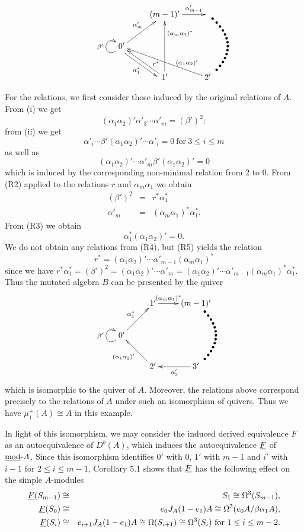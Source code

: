 \documentclass{amsart}
\begin{document}
$$\xymatrix{ & (m-1)' \ar@{<-}[dl]_{\alpha'_m} &   \ar@{<-}[l]_-{\alpha'_{m-1}} \\ 0' \ar@(dl, ul)^{\beta'}  \ar@{<-}[drr]^(.7){(\alpha_1\alpha_2)'} \ar[dr]<-1ex>_{\alpha_1^*}\\ & 1' \ar[ul]_(.3){r^*}  \ar[uu]_(.7){(\alpha_m\alpha_1)^*} & 2' \ar @{{}{*}} @/_2pc/[uu]}$$

For the relations, we first consider those induced by the original relations of $A$.  From (i) we get $$(\alpha_1\alpha_2)' \alpha'_3 \cdots \alpha'_m= (\beta')^2;$$ from (ii) we get $$\alpha'_i \cdots \beta' (\alpha_1 \alpha_2)' \cdots \alpha'_i = 0 \ \mbox{for}\ 3 \leq i \leq m$$ as well as $$(\alpha_1\alpha_2)' \cdots \alpha'_m \beta' (\alpha_1 \alpha_2)' = 0 $$ which is induced by the corresponding non-minimal relation from $2$ to $0$.  
From (R2) applied to the relations $r$ and $\alpha_m \alpha_1$ we obtain 
\begin{eqnarray*} (\beta')^2 & =  & r^*\alpha_1^* \\
 \alpha'_m & = & (\alpha_m \alpha_1)^*\alpha_1^*.
\end{eqnarray*}
From (R3) we obtain $$\alpha_1^*(\alpha_1 \alpha_2)' = 0.$$
We do not obtain any relations from (R4), but (R5) yields the relation
$$r^* =  (\alpha_1 \alpha_2)' \cdots \alpha'_{m-1} (\alpha_m \alpha_1)^*$$ since we have $r^*\alpha_1^* = (\beta')^2 = (\alpha_1\alpha_2)' \cdots \alpha'_m = (\alpha_1\alpha_2)' \cdots \alpha'_{m-1} (\alpha_m\alpha_1)^*\alpha_1^*$.  Thus the mutated algebra $B$ can be presented by the quiver 
$$\xymatrix{ & 1'  \ar@{<-}[dl]_{\alpha_1^*}  \ar[r]^-{(\alpha_m\alpha_1)^*} &   (m-1)' \\ 0'  \ar@(dl, ul)^{\beta'} \ar@{<-}[dr]_{(\alpha_1\alpha_2)'} \\ & 2' \ar@{<-}[r]_{\alpha'_3}  & 3' \ar @{{}{*}} @/_2pc/[uu]}$$
which is isomorphic to the quiver of $A$.  Moreover, the relations above correspond precisely to the relations of $A$ under such an isomorphism of quivers.  Thus we have $\mu_1^+(A) \cong A$ in this example.
 
In light of this isomorphism, we may consider the induced derived equivalence $F$ as an autoequivalence of $D^b(A)$, which induces the autoequivalence $\underline{F}$ of $\mbox{\underline{mod}-} A$.  Since this isomorphism identifies $0'$ with $0$, $1'$ with $m-1$ and $i'$ with $i-1$ for $2 \leq i \leq m-1$, Corollary 5.1 shows that $\underline{F}$ has the following effect on the simple $A$-modules 
\begin{eqnarray*} \und{F}(S_{m-1}) & \cong & S_1 \cong \Omega^3(S_{m-1}), \\ \und{F}(S_0) & \cong & e_0J_A(1-e_{1})A \cong \Omega^3(e_0A/\beta \alpha_1 A), \\ \und{F}(S_i) & \cong & e_{i+1}J_A(1-e_1)A \cong \Omega(S_{i+1})  \cong \Omega^3(S_i) \ \mbox{for}\ 1 \leq i \leq m-2. \end{eqnarray*}
\end{document}
